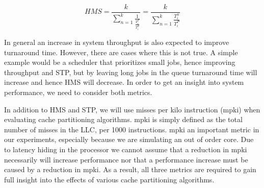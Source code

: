 \begin{equation} \label{eq:HMS}
 HMS = \frac{k}{{\sum\limits_{n=1}^{k}\frac{1}{\frac{T^{P}_i}{T^{S}_i}}}} = \frac{k}{{\sum\limits_{n=1}^{k}\frac{T^{S}_i}{T^{P}_i}}}
\end{equation}

In general an increase in system throughput is also expected to improve turnaround time.
However, there are cases where this is not true.
A simple example would be a scheduler that prioritizes small jobs, hence improving throughput and STP, but by leaving long jobs in the queue turnaround time will increase and hence HMS will decrease.
In order to get an insight into system performance, we need to consider both metrics.

In addition to HMS and STP, we will use misses per kilo instruction (mpki) when evaluating cache partitioning algorithms.
mpki is simply defined as the total number of misses in the LLC, per 1000 instructions.
mpki an important metric in our experiments, especially because we are simulating an out of order core. 
Due to latency hiding in the processor we cannot assume that a reduction in mpki necessarily will increase performance nor that a performance increase must be caused by a reduction in mpki.
As a result, all three metrics are required to gain full insight into the effects of various cache partitioning algorithms.